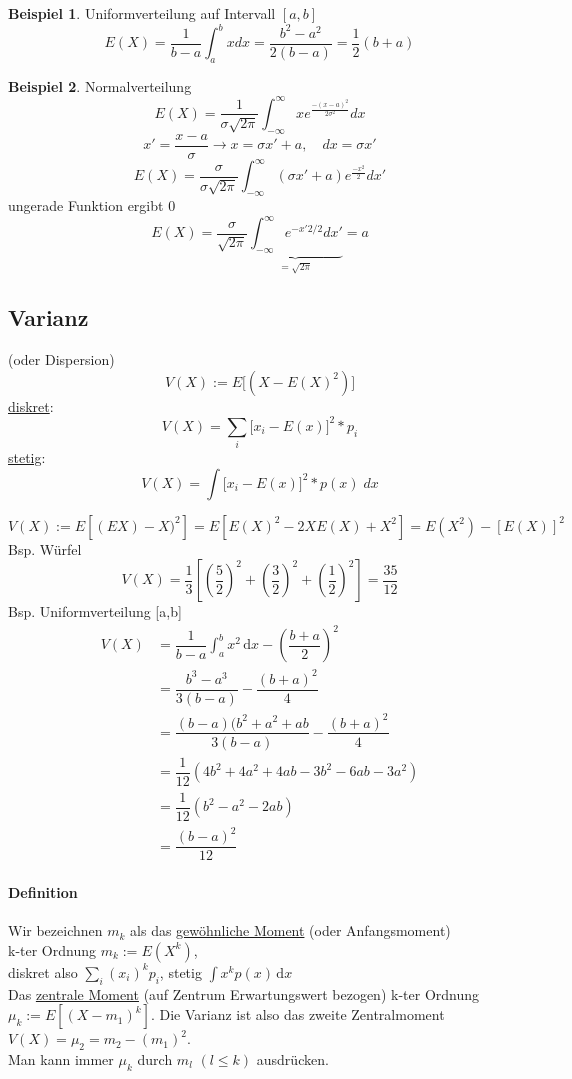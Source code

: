 \documentclass[10pt]{report}
\theoremstyle{definition}
\newtheorem{exmp}{Beispiel}
\begin{document}
\begin{exmp}
	Uniformverteilung auf Intervall $[a,b]$
	\[ E(X)= \frac{1}{b-a} \int_{a}^b x dx =  \frac{b^2 - a^2}{2(b-a)} = \frac{1}{2}(b+a) \]
\end{exmp}


\begin{exmp}
	Normalverteilung
\[ E(X)= \frac{1}{\sigma \sqrt{2 \pi}} \int_{-\infty}^{\infty} x e^{\frac{-(x-a)^2}{2\sigma^2}} dx \]
\[ x' = \frac{x-a}{\sigma} \rightarrow x = \sigma x' + a ,\quad dx= \sigma x' \]
\[ E(X) = \frac{\sigma}{\sigma \sqrt{2 \pi}} \int_{- \infty}^{\infty} (\sigma x' + a) e^{\frac{-x^2}{2}} dx' \]
ungerade Funktion ergibt 0
\[ E(X) = \frac{\sigma}{\sqrt{2 \pi}} \underbrace{\int_{- \infty}^{\infty} e^{-x' 2/2} dx'}_{=\sqrt{2 \pi}} = a \]
\end{exmp}

\subsection{Varianz} (oder Dispersion)
\[ V(X) := E \big[ (X-E(X)^2) \big] \]
\underline{diskret}: 
\[ V(X) = \sum\limits_{i} \big[ x_i - E(x) \big] ^2 * p_i \]
\underline{stetig}: 
\[ V(X) = \int \big[ x_i - E(x) \big] ^2 * p(x)\; dx \]


\[
V(X) := E[(EX)-X)^2] = E[E(X)^2 - 2X E(X) + X^2]  = E(X^2) - [E(X)]^2
\]
Bsp. Würfel
\[
V(X) = \dfrac{1}{3} \left[\left(\dfrac{5}{2}\right)^2 + \left(\dfrac{3}{2}\right)^2 + \left(\dfrac{1}{2}\right)^2\right] = \dfrac{35}{12}
\]
Bsp. Uniformverteilung [a,b]
\begin{align*}
V(X) &= \dfrac{1}{b-a} \int_a^b \! x^2 \, \mathrm{d}x - \left(\dfrac{b+a}{2}\right)^2\\
&= \dfrac{b^3 - a^3}{3 (b-a)} - \dfrac{(b+a)^2}{4} \\
&= \dfrac{(b-a) (b^2+a^2+ab}{3(b-a)} - \dfrac{(b+a)^2}{4}\\
&= \dfrac{1}{12} (4b^2+4a^2+4ab-3b^2-6 ab-3a^2)\\
&= \dfrac{1}{12} (b^2-a^2-2ab) \\
&= \dfrac{(b-a)^2}{12}
\end{align*}
\paragraph{Definition}
Wir bezeichnen $m_k$ als das \underline{gewöhnliche Moment} (oder Anfangsmoment)\\
k-ter Ordnung $m_k := E(X^k)$, \\
diskret also $\sum_i\left(x_i\right)^k p_i$,
stetig $\int \! x^k p(x) \, \mathrm{d}x$
\\
Das \underline{zentrale Moment} (auf Zentrum Erwartungswert bezogen) k-ter Ordnung \\
$\mu_k := E\left[(X-m_1)^k\right]$. Die Varianz ist also das zweite Zentralmoment $V(X) = \mu_2 = m_2 - (m_1)^2$.\\
Man kann immer $\mu_k$ durch $m_l$ $\left( l \leq k\right)$ ausdrücken.
\end{document}
